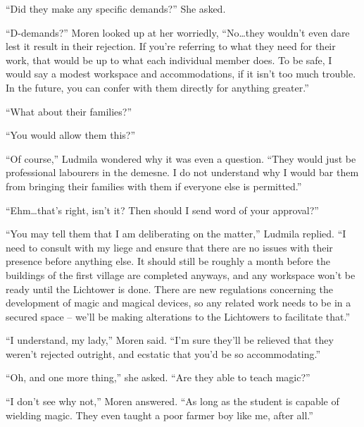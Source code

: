  

“Did they make any specific demands?” She asked.

 

“D-demands?” Moren looked up at her worriedly, “No…they wouldn’t even dare lest it result in their rejection. If you’re referring to what they need for their work, that would be up to what each individual member does. To be safe, I would say a modest workspace and accommodations, if it isn’t too much trouble. In the future, you can confer with them directly for anything greater.”

 

“What about their families?”

 

“You would allow them this?”

 

“Of course,” Ludmila wondered why it was even a question. “They would just be professional labourers in the demesne. I do not understand why I would bar them from bringing their families with them if everyone else is permitted.”

 

“Ehm…that’s right, isn’t it? Then should I send word of your approval?”

 

“You may tell them that I am deliberating on the matter,” Ludmila replied. “I need to consult with my liege and ensure that there are no issues with their presence before anything else. It should still be roughly a month before the buildings of the first village are completed anyways, and any workspace won’t be ready until the Lichtower is done. There are new regulations concerning the development of magic and magical devices, so any related work needs to be in a secured space – we’ll be making alterations to the Lichtowers to facilitate that.”

 

“I understand, my lady,” Moren said. “I’m sure they’ll be relieved that they weren’t rejected outright, and ecstatic that you’d be so accommodating.”

 

“Oh, and one more thing,” she asked. “Are they able to teach magic?”

 

“I don’t see why not,” Moren answered. “As long as the student is capable of wielding magic. They even taught a poor farmer boy like me, after all.”

